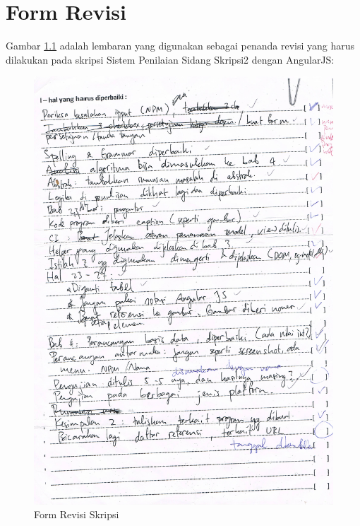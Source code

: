 \chapter{Form Revisi}
\label{chap: revisi}

Gambar \ref{fig: revisi} adalah lembaran yang digunakan sebagai penanda revisi yang harus dilakukan pada skripsi Sistem Penilaian Sidang Skripsi2 dengan AngularJS:

\begin{figure}[H]
\centering
\includegraphics[scale=0.60]{Gambar/revisi}
\caption[Form Revisi Skripsi]{Form Revisi Skripsi} 
\label{fig: revisi}
\end{figure}
